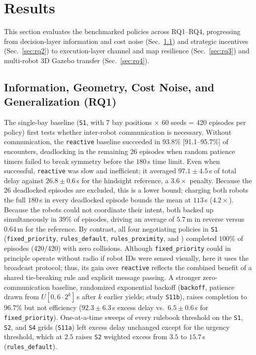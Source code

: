 \section{Results}\label{sec:results}
This section evaluates the benchmarked policies across RQ1--RQ4, progressing from decision-layer information and cost noise (Sec.~\ref{sec:rq1}) and strategic incentives (Sec.~\ref{sec:rq2}) to execution-layer channel and map resilience (Sec.~\ref{sec:rq3}) and multi-robot 3D Gazebo transfer (Sec.~\ref{sec:rq4}).

\subsection{Information, Geometry, Cost Noise, and Generalization (RQ1)}\label{sec:rq1}
The single-bay baseline (\texttt{S1}, with 7 bay positions $\times$ 60 seeds = 420 episodes per policy) first tests whether inter-robot communication is necessary. Without communication, the \texttt{reactive} baseline succeeded in $93.8\%$ [91.1--95.7\%] of encounters, deadlocking in the remaining 26 episodes when random patience timers failed to break symmetry before the $180$\,s time limit. Even when successful, \texttt{reactive} was slow and inefficient; it averaged $97.1\pm4.5$\,s of total delay against $26.8\pm0.6$\,s for the hindsight reference, a $3.6\times$ penalty. Because the 26 deadlocked episodes are excluded, this is a lower bound; charging both robots the full $180$\,s in every deadlocked episode bounds the mean at $113$\,s ($4.2\times$). Because the robots could not coordinate their intent, both backed up simultaneously in $39\%$ of episodes, driving an average of $5.7$\,m in reverse versus $0.64$\,m for the reference. By contrast, all four negotiating policies in \texttt{S1} (\texttt{fixed\_priority}, \texttt{rules\_default}, \texttt{rules\_proximity}, and \cb) completed $100\%$ of episodes (420/420) with zero collisions. Although \texttt{fixed\_priority} could in principle operate without radio if robot IDs were sensed visually, here it uses the broadcast protocol; thus, its gain over \texttt{reactive} reflects the combined benefit of a shared tie-breaking rule and explicit message passing. A stronger zero-communication baseline, randomized exponential backoff (\texttt{backoff}, patience drawn from $U[0, 6\cdot2^{k}]$\,s after $k$ earlier yields; study \texttt{S11b}), raises completion to $96.7\%$ but not efficiency ($92.3\pm6.3$\,s excess delay vs.\ $6.5\pm0.6$\,s for \texttt{fixed\_priority}). One-at-a-time sweeps of every rulebook threshold on the \texttt{S1}, \texttt{S2}, and \texttt{S4} grids (\texttt{S11a}) left excess delay unchanged except for the urgency threshold, which at $2.5$ raises \texttt{S2} weighted excess from $3.5$ to $15.7$\,s (\texttt{rules\_default}).

